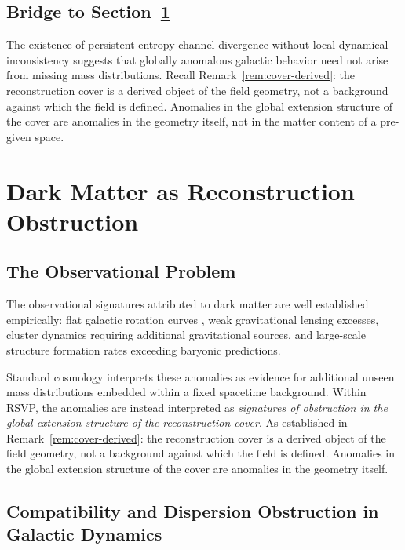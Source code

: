 \documentclass[11pt, a4paper]{article}
\theoremstyle{plain}
\theoremstyle{definition}
\theoremstyle{remark}
\begin{document}
\subsection{Bridge to Section~\ref{sec:darkmatter}}

The existence of persistent entropy-channel divergence without local dynamical
inconsistency suggests that globally anomalous galactic behavior need not arise from
missing mass distributions. Recall Remark~\ref{rem:cover-derived}: the reconstruction
cover is a derived object of the field geometry, not a background against which the
field is defined. Anomalies in the global extension structure of the cover are
anomalies in the geometry itself, not in the matter content of a pre-given space.

\section{Dark Matter as Reconstruction Obstruction}
\label{sec:darkmatter}

\subsection{The Observational Problem}

The observational signatures attributed to dark matter are well established
empirically: flat galactic rotation curves \cite{mcgaugh2011,famaey2012}, weak
gravitational lensing excesses, cluster dynamics requiring additional gravitational
sources, and large-scale structure formation rates exceeding baryonic predictions.

Standard cosmology interprets these anomalies as evidence for additional unseen mass
distributions embedded within a fixed spacetime background. Within RSVP, the
anomalies are instead interpreted as \emph{signatures of obstruction in the global
extension structure of the reconstruction cover}. As established in
Remark~\ref{rem:cover-derived}: the reconstruction cover is a derived object of the
field geometry, not a background against which the field is defined. Anomalies in
the global extension structure of the cover are anomalies in the geometry itself.

\subsection{Compatibility and Dispersion Obstruction in Galactic Dynamics}
\end{document}
